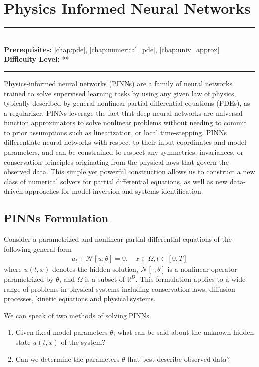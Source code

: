 \documentclass[book.tex]{subfiles}
\begin{document}
\chapter{Physics Informed Neural Networks}

\label{chap:pinns}
\noindent\rule{11cm}{0.4pt} \\
\textbf{Prerequisites:}  \autoref{chap:pde}, \autoref{chap:numerical_pde}, \autoref{chap:univ_approx}  \\
\textbf{Difficulty Level:} ** \\
\noindent\rule{11cm}{0.4pt}
\vspace{5mm}

Physics-informed neural networks (PINNs) are a family of neural networks trained to solve supervised learning tasks by using any given law of physics, typically described by general nonlinear partial differential equations (PDEs)\cite{raissi2019physics}, as a regularizer. PINNs leverage the fact that deep neural networks are universal function approximators to solve nonlinear problems without needing to commit to prior assumptions such as linearization, or local time-stepping. PINNs differentiate neural networks with respect to their input coordinates and model parameters, and can be constrained to respect any symmetries, invariances, or conservation principles originating from the physical laws that govern the observed data. This simple yet powerful construction allows us to construct a new class of numerical solvers for partial differential equations, as well as new data-driven approaches for model inversion and systems identification.



\section{PINNs Formulation}
Consider a parametrized and nonlinear partial differential equations of the following general form 
\begin{align}
    u_t + \mathcal{N}[u;\theta]=0,\quad x \in \Omega, t\in [0,T]
    \label{eq_generalform}
\end{align}
where $u(t, x)$ denotes the hidden solution, $\mathcal{N[\cdot;\theta]}$ is a nonlinear operator parametrized by $\theta$, and $\Omega$ is a subset of $\mathbb{R}^D$. This formulation applies to a wide range of problems in physical systems including conservation laws, diffusion processes, kinetic equations and physical systems.

We can speak of two methods of solving PINNs.
\begin{enumerate}
    \item Given fixed model parameters $\theta$, what can be said about the unknown hidden state $u(t, x)$ of the system?
    \item Can we determine the parameters $\theta$ that best describe observed data?
\end{enumerate}
\end{document}
